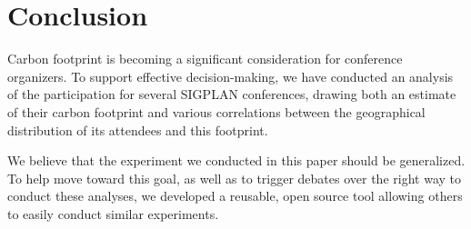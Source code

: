 \section{Conclusion}

Carbon footprint is becoming a significant consideration for conference
organizers. To support effective decision-making, we have conducted an
analysis of the participation for several SIGPLAN conferences, drawing both
an estimate of their carbon footprint and various correlations between the
geographical distribution of its attendees and this footprint.


We believe that the experiment we conducted in this paper should be
generalized.  To help move toward this goal, as well as to trigger debates
over the right way to conduct these analyses, we developed a reusable, open
source tool allowing others to easily conduct similar experiments.
